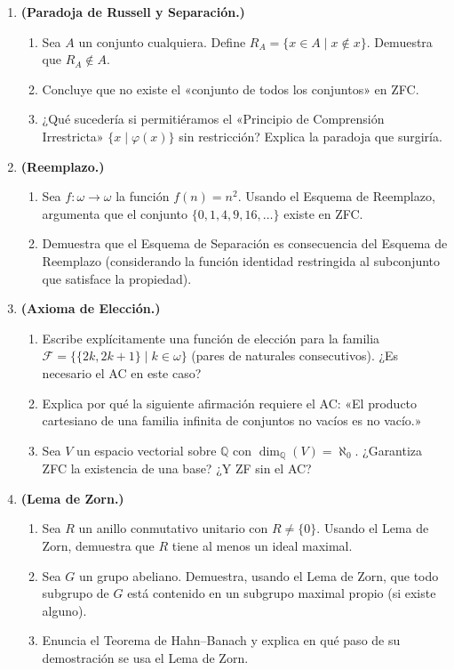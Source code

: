 \begin{enumerate}[leftmargin=2em, label=\textbf{P\arabic*.}, itemsep=0.8em]
  \item \textbf{(Paradoja de Russell y Separación.)}
  \begin{enumerate}[label=(\alph*)]
    \item Sea $A$ un conjunto cualquiera. Define $R_A = \{x \in A \mid x \notin x\}$. Demuestra que $R_A \notin A$.
    \item Concluye que no existe el «conjunto de todos los conjuntos» en ZFC.
    \item ¿Qué sucedería si permitiéramos el «Principio de Comprensión Irrestricta» $\{x \mid \varphi(x)\}$ sin restricción? Explica la paradoja que surgiría.
  \end{enumerate}

  \item \textbf{(Reemplazo.)}
  \begin{enumerate}[label=(\alph*)]
    \item Sea $f: \omega \to \omega$ la función $f(n) = n^2$. Usando el Esquema de Reemplazo, argumenta que el conjunto $\{0, 1, 4, 9, 16, \ldots\}$ existe en ZFC.
    \item Demuestra que el Esquema de Separación es consecuencia del Esquema de Reemplazo (considerando la función identidad restringida al subconjunto que satisface la propiedad).
  \end{enumerate}

  \item \textbf{(Axioma de Elección.)}
  \begin{enumerate}[label=(\alph*)]
    \item Escribe explícitamente una función de elección para la familia $\mathcal{F} = \{\{2k, 2k+1\} \mid k \in \omega\}$ (pares de naturales consecutivos). ¿Es necesario el AC en este caso?
    \item Explica por qué la siguiente afirmación requiere el AC: «El producto cartesiano de una familia infinita de conjuntos no vacíos es no vacío.»
    \item Sea $V$ un espacio vectorial sobre $\mathbb{Q}$ con $\dim_{\mathbb{Q}}(V) = \aleph_0$. ¿Garantiza ZFC la existencia de una base? ¿Y ZF sin el AC?
  \end{enumerate}

  \item \textbf{(Lema de Zorn.)}
  \begin{enumerate}[label=(\alph*)]
    \item Sea $R$ un anillo conmutativo unitario con $R \neq \{0\}$. Usando el Lema de Zorn, demuestra que $R$ tiene al menos un ideal maximal.
    \item Sea $G$ un grupo abeliano. Demuestra, usando el Lema de Zorn, que todo subgrupo de $G$ está contenido en un subgrupo maximal propio (si existe alguno).
    \item Enuncia el Teorema de Hahn–Banach y explica en qué paso de su demostración se usa el Lema de Zorn.
  \end{enumerate}


\end{enumerate}
